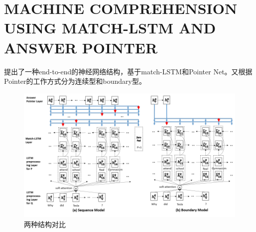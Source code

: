 \documentclass[a4paper,UTF8]{article}
\numberwithin{equation}{section}
\begin{document}
\newpage
\section{MACHINE COMPREHENSION USING MATCH-LSTM AND ANSWER POINTER}
提出了一种end-to-end的神经网络结构，基于match-LSTM和Pointer Net。又根据Pointer的工作方式分为连续型和boundary型。
\begin{figure}[H]
	\centering
	\includegraphics[width=\textwidth]{3-1.png}
	\caption{两种结构对比}
\end{figure}
\end{document}
